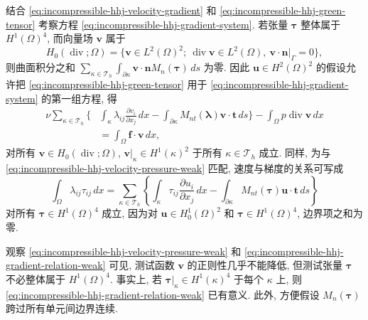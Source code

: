 结合 \eqref{eq:incompressible-hhj-velocity-gradient}
和 \eqref{eq:incompressible-hhj-green-tensor}
考察方程 \eqref{eq:incompressible-hhj-gradient-system}.
若张量 $\boldsymbol\tau$ 整体属于 $H^1(\Omega)^4$,
而向量场 $\mathbf v$ 属于
\[
H_0(\operatorname{div};\Omega)
=\{\mathbf v\in L^2(\Omega)^2;
\ \operatorname{div}\mathbf v\in L^2(\Omega),
\ \mathbf v\cdot\mathbf n|_\Gamma=0\},
\]
则曲面积分之和
$\sum_{\kappa\in\mathcal T_h}
\int_{\partial\kappa}\mathbf v\cdot\mathbf n
M_n(\boldsymbol\tau)\,ds$ 为零.
因此 $\mathbf u\in H^2(\Omega)^2$ 的假设允许把
\eqref{eq:incompressible-hhj-green-tensor}
用于 \eqref{eq:incompressible-hhj-gradient-system} 的第一组方程, 得
\begin{equation}\label{eq:incompressible-hhj-velocity-pressure-weak}
\begin{split}
\nu\sum_{\kappa\in\mathcal T_h}
\biggl\{&\int_\kappa\lambda_{ij}
\frac{\partial v_i}{\partial x_j}\,dx
-\int_{\partial\kappa}M_{nt}(\boldsymbol\lambda)
\mathbf v\cdot\mathbf t\,ds\biggr\}
-\int_\Omega p\operatorname{div}\mathbf v\,dx\\
&=\int_\Omega\mathbf f\cdot\mathbf v\,dx,
\end{split}
\end{equation}
对所有 $\mathbf v\in H_0(\operatorname{div};\Omega)$,
$\mathbf v|_\kappa\in H^1(\kappa)^2$
于所有 $\kappa\in\mathcal T_h$ 成立.
同样, 为与 \eqref{eq:incompressible-hhj-velocity-pressure-weak} 匹配,
速度与梯度的关系可写成
\begin{equation}\label{eq:incompressible-hhj-gradient-relation-weak}
\int_\Omega\lambda_{ij}\tau_{ij}\,dx
=\sum_{\kappa\in\mathcal T_h}
\left\{
\int_\kappa\tau_{ij}\frac{\partial u_i}{\partial x_j}\,dx
-\int_{\partial\kappa}M_{nt}(\boldsymbol\tau)
\mathbf u\cdot\mathbf t\,ds
\right\}
\end{equation}
对所有 $\boldsymbol\tau\in H^1(\Omega)^4$ 成立,
因为对 $\mathbf u\in H_0^1(\Omega)^2$
和 $\boldsymbol\tau\in H^1(\Omega)^4$,
边界项之和为零.

观察 \eqref{eq:incompressible-hhj-velocity-pressure-weak}
和 \eqref{eq:incompressible-hhj-gradient-relation-weak} 可见,
测试函数 $\mathbf v$ 的正则性几乎不能降低,
但测试张量 $\boldsymbol\tau$ 不必整体属于 $H^1(\Omega)^4$.
事实上, 若 $\boldsymbol\tau|_\kappa\in H^1(\kappa)^4$
于每个 $\kappa$ 上, 则
\eqref{eq:incompressible-hhj-gradient-relation-weak} 已有意义.
此外, 方便假设 $M_n(\boldsymbol\tau)$
跨过所有单元间边界连续.

